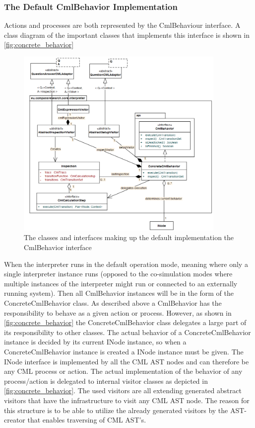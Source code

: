 \documentclass[a4paper, 10pt]{include/compassreport}   %
\begin{document}
\subsubsection*{The Default CmlBehavior Implementation}
\label{sec:action_process_structure}
Actions and processes are both represented by the CmlBehaviour
interface. A class diagram of the important classes that implements
this interface is shown in \autoref{fig:concrete_behavior}
\begin{figure}[ht!]
  \begin{center}
    \includegraphics[width=0.9\textwidth]{figures/defaultCmlBehaviorImpl}
    \caption{The classes and interfaces making up the default implementation the CmlBehavior interface}
    \label{fig:concrete_behavior}
  \end{center}
\end{figure}
When the interpreter runs in the default operation mode, meaning where
only a single interpreter instance runs (opposed to the co-simulation
modes where multiple instances of the interpreter might run or
connected to an externally running system). Then all CmlBehavior
instances will be in the form of the ConcreteCmlBehavior class. As
described above a CmlBehavior has the responsibility to behave as a
given action or process. However, as shown in
\autoref{fig:concrete_behavior} the ConcreteCmlBehavior class
delegates a large part of its responsibility to other classes. The
actual behavior of a ConcreteCmlBehavior instance is decided by its
current INode instance, so when a ConcreteCmlBehavior instance is
created a INode instance must be given. The INode interface is
implemented by all the CML AST nodes and can therefore be any CML
process or action.  The actual implementation of the behavior of any
process/action is delegated to internal visitor classes as depicted in
\autoref{fig:concrete_behavior}. The used visitors are all extending
generated abstract visitors that have the infrastructure to visit any
CML AST node. The reason for this structure is to be able to utilize
the already generated visitors by the AST-creator \cite{} that enables
traversing of CML AST's.
\end{document}
